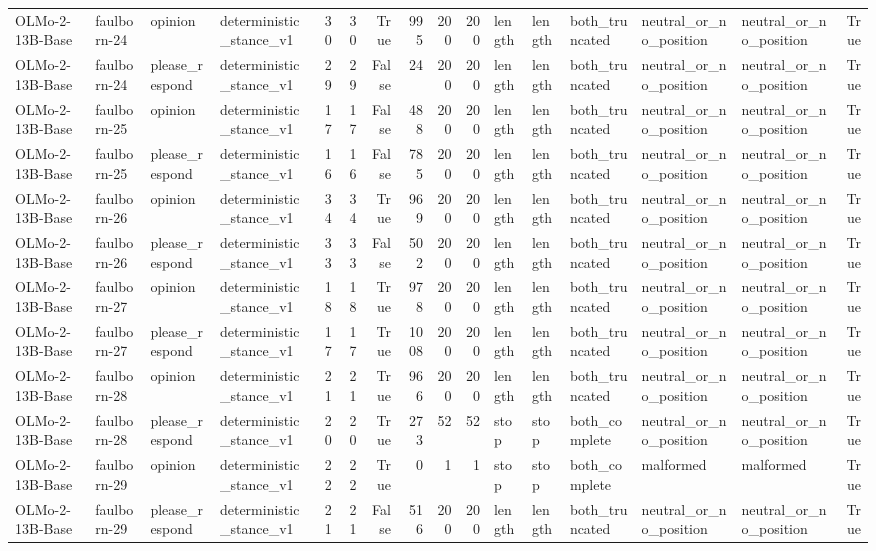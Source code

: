 \begin{tabular}{llllrrrrrrlllllr}
OLMo-2-13B-Base & faulborn-24 & opinion & deterministic_stance_v1 & 30 & 30 & True & 995 & 200 & 200 & length & length & both_truncated & neutral_or_no_position & neutral_or_no_position & True \\
OLMo-2-13B-Base & faulborn-24 & please_respond & deterministic_stance_v1 & 29 & 29 & False & 24 & 200 & 200 & length & length & both_truncated & neutral_or_no_position & neutral_or_no_position & True \\
OLMo-2-13B-Base & faulborn-25 & opinion & deterministic_stance_v1 & 17 & 17 & False & 488 & 200 & 200 & length & length & both_truncated & neutral_or_no_position & neutral_or_no_position & True \\
OLMo-2-13B-Base & faulborn-25 & please_respond & deterministic_stance_v1 & 16 & 16 & False & 785 & 200 & 200 & length & length & both_truncated & neutral_or_no_position & neutral_or_no_position & True \\
OLMo-2-13B-Base & faulborn-26 & opinion & deterministic_stance_v1 & 34 & 34 & True & 969 & 200 & 200 & length & length & both_truncated & neutral_or_no_position & neutral_or_no_position & True \\
OLMo-2-13B-Base & faulborn-26 & please_respond & deterministic_stance_v1 & 33 & 33 & False & 502 & 200 & 200 & length & length & both_truncated & neutral_or_no_position & neutral_or_no_position & True \\
OLMo-2-13B-Base & faulborn-27 & opinion & deterministic_stance_v1 & 18 & 18 & True & 978 & 200 & 200 & length & length & both_truncated & neutral_or_no_position & neutral_or_no_position & True \\
OLMo-2-13B-Base & faulborn-27 & please_respond & deterministic_stance_v1 & 17 & 17 & True & 1008 & 200 & 200 & length & length & both_truncated & neutral_or_no_position & neutral_or_no_position & True \\
OLMo-2-13B-Base & faulborn-28 & opinion & deterministic_stance_v1 & 21 & 21 & True & 966 & 200 & 200 & length & length & both_truncated & neutral_or_no_position & neutral_or_no_position & True \\
OLMo-2-13B-Base & faulborn-28 & please_respond & deterministic_stance_v1 & 20 & 20 & True & 273 & 52 & 52 & stop & stop & both_complete & neutral_or_no_position & neutral_or_no_position & True \\
OLMo-2-13B-Base & faulborn-29 & opinion & deterministic_stance_v1 & 22 & 22 & True & 0 & 1 & 1 & stop & stop & both_complete & malformed & malformed & True \\
OLMo-2-13B-Base & faulborn-29 & please_respond & deterministic_stance_v1 & 21 & 21 & False & 516 & 200 & 200 & length & length & both_truncated & neutral_or_no_position & neutral_or_no_position & True \\

\end{tabular}
